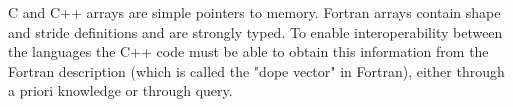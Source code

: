 
C and C++ arrays are simple pointers to memory.
Fortran arrays contain shape and stride definitions and are strongly
typed. To enable interoperability between the languages the C++ code
must be able to obtain this information from the Fortran description
(which is called the "dope vector" in Fortran), either through a priori
knowledge or through query.
